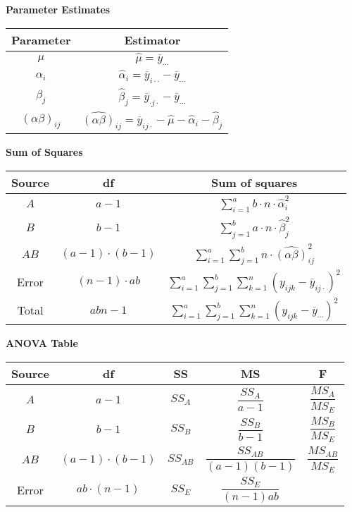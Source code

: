 \documentclass[a4paper]{article}
\begin{document}
\textbf{Parameter Estimates}
\begin{table}[!htbp]
    \centering
    \begin{tabular}{c|c}
    \textbf{Parameter} & \textbf{Estimator} \\
    \hline
    $\mu$ & $\hat{\mu}=\overline{y}_{\cdots}$ \\
    \hline 
    $\alpha_i$ & $\hat{\alpha}_i=\overline{y}_{i\cdot\cdot}-\overline{y}_{\cdots}$ \\
    \hline
    $\beta_j$ & $\hat{\beta}_j=\overline{y}_{\cdot j\cdot}-\overline{y}_{\cdots}$ \\
    \hline
    $(\alpha\beta)_{ij}$ & $\widehat{(\alpha\beta)}_{ij}=\overline{y}_{ij\cdot}-\hat{\mu}-\hat{\alpha}_i-\hat{\beta}_j$
    \end{tabular}
\end{table}

\textbf{Sum of Squares}
\begin{table}[!htbp]
    \centering
    \begin{tabular}{c|c|c}
    \textbf{Source} & \textbf{df} & \textbf{Sum of squares}  \\
    \hline
    $A$ & $a-1$ & $\sum\limits_{i=1}^{a}b\cdot n\cdot\hat{\alpha}_i^2$ \\
    \hline
    $B$ & $b-1$ & $\sum\limits_{j=1}^{b}a\cdot n\cdot\hat{\beta}_j^2$ \\
    \hline
    $AB$ & $(a-1)\cdot(b-1)$ & $\sum\limits_{i=1}^a\sum\limits_{j=1}^b n\cdot\widehat{(\alpha\beta)}_{ij}^2$ \\
    \hline
    Error & $(n-1)\cdot ab$ & $\sum\limits_{i=1}^a\sum\limits_{j=1}^b\sum\limits_{k=1}^n(y_{ijk}-\overline{y}_{ij\cdot})^2$ \\
    \hline
    Total & $abn-1$ & $\sum\limits_{i=1}^a\sum\limits_{j=1}^b\sum\limits_{k=1}^n(y_{ijk}-\overline{y}_{\cdots})^2$
    \end{tabular}
\end{table}

\textbf{ANOVA Table}
\begin{table}[!htbp]
    \centering
    \begin{tabular}{c|c|c|c|c}
    \textbf{Source} & \textbf{df} & \textbf{SS} & \textbf{MS} & \textbf{F} \\
    \hline
    $A$ & $a-1$ & $SS_A$ & $\dfrac{SS_A}{a-1}$ & $\dfrac{MS_A}{MS_E}$ \\
    \hline
    $B$ & $b-1$ & $SS_B$ & $\dfrac{SS_B}{b-1}$ & $\dfrac{MS_B}{MS_E}$ \\
    \hline
    $AB$ & $(a-1)\cdot(b-1)$ & $SS_{AB}$ & $\dfrac{SS_{AB}}{(a-1)(b-1)}$ & $\dfrac{MS_{AB}}{MS_E}$ \\
    \hline
    Error & $ab\cdot(n-1)$ & $SS_E$ & $\dfrac{SS_E}{(n-1)ab}$
    \end{tabular}
\end{table}
\end{document}
